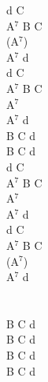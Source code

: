 \documentclass[a5paper, 10pt]{book}
\begin{document}
\begin{minipage}[t]{0.2\textwidth}
  d C\\
  A$^7$ B C\\
  (A$^7$)\\
  A$^7$ d\\

  d C\\
  A$^7$ B C\\
  A$^7$\\
  A$^7$ d\\

  B C d\\
  B C d\\

  d C\\
  A$^7$ B C\\
  A$^7$\\
  A$^7$ d\\

  d C\\
  A$^7$ B C\\
  (A$^7$)\\
  A$^7$ d\\

  ~\\~\\
  B C d\\
  B C d\\
  B C d\\
  B C d\\
\end{minipage}

\newpage
\end{document}
